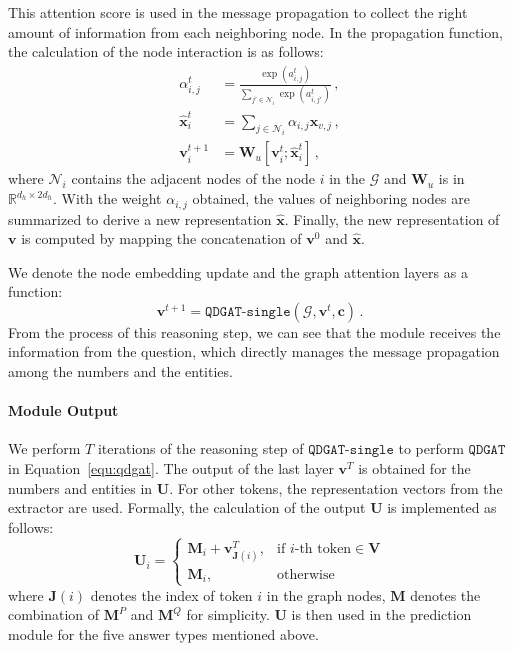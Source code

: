 \documentclass{article}
\begin{document}
This attention score is used in the message propagation to collect the right amount of information from each neighboring node.
In the propagation function, the calculation of the node interaction is as follows:
\begin{align}
\alpha^t_{i,j} &= \frac{\exp (a^t_{i,j})}{\sum_{j' \in \mathcal{N}_i} \exp (a^t_{i,j'})} \,, \\
\hat{\mathbf{x}}^t_i &= \sum_{j \in \mathcal{N}_i} \alpha_{i,j} \mathbf{x}_{v,j} \,,\\
\mathbf{v}^{t+1}_i &= \mathbf{W}_u [\mathbf{v}^t_i ; \hat{\mathbf{x}}^t_i]  \,,
\end{align}
where $\mathcal{N}_i$ contains the adjacent nodes of the node $i$ in the $\mathcal{G}$ and $\mathbf{W}_u$ is in  $\mathbb{R}^{d_h\times 2d_h}$.
With the weight $\alpha_{i,j}$ obtained, the values of neighboring nodes are summarized to derive a new representation $\hat{\mathbf{x}}$.
Finally, the new representation of $\mathbf{v}$ is computed by mapping the concatenation of $\mathbf{v}^0$ and $\hat{\mathbf{x}}$.


We denote the node embedding update and the graph attention layers as a function:
\begin{equation}
\mathbf{v}^{t+1} = \texttt{QDGAT-single}(\mathcal{G}, \mathbf{v}^t, \mathbf{c}) \,.
\end{equation}
From the process of this reasoning step, we can see that the module receives the information from the question, which directly manages the message propagation among the numbers and the entities. 

\paragraph{Module Output}
We perform $T$ iterations of the reasoning step of $\texttt{QDGAT-single}$ to perform $\texttt{QDGAT}$ in Equation~\ref{equ:qdgat}.
The output of the last layer $\mathbf{v}^T$ is obtained for the numbers and entities in $\mathbf{U}$.
For other tokens, the representation vectors from the extractor are used.
Formally, the calculation of the output $\mathbf{U}$ is implemented as follows:
\begin{equation}
\mathbf{U}_i = 
\begin{cases}
    \mathbf{M}_i + \mathbf{v}^T_{\mathbf{J}(i)},& \text{if } i\text{-th token} \in \mathbf{V} \\
    \mathbf{M}_i, & \text{otherwise } 
\end{cases}
\end{equation}
where $\mathbf{J}(i)$ denotes the index of token $i$ in the graph nodes, $\mathbf{M}$ denotes the combination of $\mathbf{M}^P$ and $\mathbf{M}^Q$ for simplicity.
$\mathbf{U}$ is then used in the prediction module for the five answer types mentioned above. 
\end{document}
